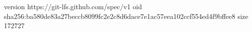 version https://git-lfs.github.com/spec/v1
oid sha256:ba580de83a27beccb8099fc2e2c8d6dace7e1ac57eea102ccf554ed4f9bffee8
size 172727

